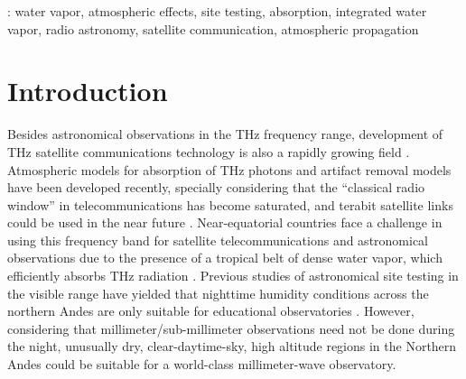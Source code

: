 \documentclass[12pt]{iopart}
\begin{document}
%
: water vapor, atmospheric effects, site testing, absorption, integrated water vapor, radio astronomy, satellite communication, atmospheric propagation\\
%
%
% 
%


\section{Introduction}

Besides astronomical observations in the THz frequency range, development of THz satellite communications technology is also a rapidly growing field \cite{newera}. Atmospheric models for absorption of THz photons \cite{rosenkranz,lababs} and artifact removal models \cite{removal} have been developed recently, specially considering that the ``classical radio window'' in telecommunications has become saturated, and terabit satellite links could be used in the near future \cite{suen2016}. Near-equatorial countries face a challenge in using this frequency band for satellite telecommunications and astronomical observations due to the presence of a tropical belt of dense water vapor, which efficiently absorbs THz radiation \cite{tropicalbelt}. Previous studies of astronomical site testing in the visible range have yielded that nighttime humidity conditions across the northern Andes are only suitable for educational observatories \cite{pinzon}. However, considering that millimeter/sub-millimeter observations need not be done during the night, unusually dry, clear-daytime-sky, high altitude regions in the Northern Andes could be suitable for a world-class millimeter-wave observatory. \\
\end{document}
